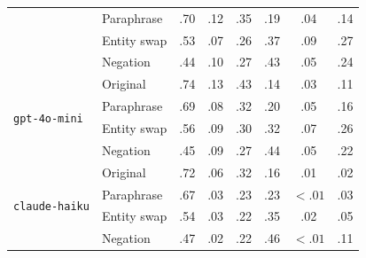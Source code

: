 \documentclass[11pt]{article}
\begin{document}
\begin{table}[ht]
\begin{tabular}{llcccccc}
  & Paraphrase  & .70        & .12        & .35        & .19        & .04        & .14 \\
  & Entity swap & .53        & .07        & .26        & .37        & .09        & .27 \\
  & Negation    & .44        & .10        & .27        & .43        & .05        & .24 \\
\midrule
\multirow{4}{*}{\texttt{gpt-4o-mini}}
  & Original    & .74        & .13        & .43        & .14        & .03        & .11 \\
  & Paraphrase  & .69        & .08        & .32        & .20        & .05        & .16 \\
  & Entity swap & .56        & .09        & .30        & .32        & .07        & .26 \\
  & Negation    & .45        & .09        & .27        & .44        & .05        & .22 \\
\midrule
\multirow{4}{*}{\texttt{claude-haiku}}
  & Original    & .72        & .06        & .32        & .16        & .01        & .02 \\
  & Paraphrase  & .67        & .03        & .23        & .23        & $<.01$      & .03 \\
  & Entity swap & .54        & .03        & .22        & .35        & .02        & .05 \\
  & Negation    & .47        & .02        & .22        & .46        & $<.01$      & .11 \\
\bottomrule
\end{tabular}
\end{table}
\end{document}
